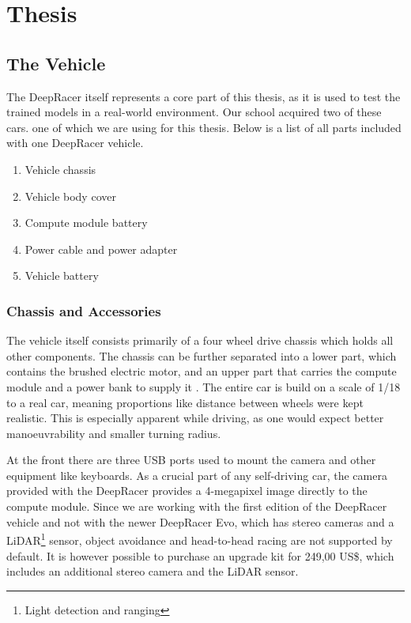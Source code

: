 \chapter{Thesis}
\label{cha:Diplomschrift}

\section{The Vehicle}

The DeepRacer itself represents a core part of this thesis, as it is used to test the trained models in a real-world environment. Our school acquired two of these cars. one of which we are using for this thesis. Below is a list of all parts included with one DeepRacer vehicle.

\begin{enumerate}
    \item Vehicle chassis
    \item Vehicle body cover
    \item Compute module battery
    \item Power cable and power adapter
    \item Vehicle battery
\end{enumerate}

\subsection{Chassis and Accessories}
The vehicle itself consists primarily of a four wheel drive chassis which holds all other components. The chassis can be further separated into a lower part, which contains the brushed electric motor, and an upper part that carries the compute module and a power bank to supply it \cite{AWS19}. The entire car is build on a scale of 1/18 to a real car, meaning proportions like distance between wheels were kept realistic. This is especially apparent while driving, as one would expect better manoeuvrability and smaller turning radius.

At the front there are three USB ports used to mount the camera and other equipment like keyboards. As a crucial part of any self-driving car, the camera provided with the DeepRacer provides a 4-megapixel image directly to the compute module. Since we are working with the first edition of the DeepRacer vehicle and not with the newer DeepRacer Evo, which has stereo cameras and a LiDAR\footnote{Light detection and ranging} sensor, object avoidance and head-to-head racing are not supported by default. It is however possible to purchase an upgrade kit for 249,00 US\$, which includes an additional stereo camera and the LiDAR sensor.

